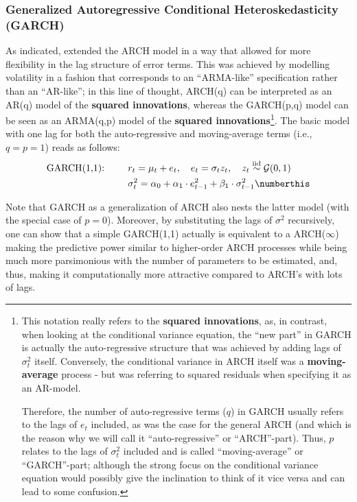 \subsubsection{Generalized Autoregressive Conditional Heteroskedasticity (GARCH)}
\label{sssec: lit_rev_vola_GARCH}

As indicated, \textcite{Bollerslev1986} extended the ARCH model in a way that allowed for more flexibility in the lag structure of error terms. This was achieved by modelling volatility in a fashion that corresponds to an \enquote{ARMA-like} specification rather than an \enquote{AR-like}; in this line of thought, ARCH(q) can be interpreted as an AR(q) model of the \textbf{squared innovations}, whereas the GARCH(p,q) model can be seen as an ARMA(q,p) model of the \textbf{squared innovations}\footnote{This notation really refers to the \textbf{squared innovations}, as, in contrast, when looking at the conditional variance equation, the \enquote{new part} in GARCH is actually the auto-regressive structure that was achieved by adding lags of $\sigma_t^2$ itself. Conversely, the conditional variance in ARCH itself was a \textbf{moving-average} process - but \textcite{Engle1982} was referring to squared residuals when specifying it as an AR-model. 

Therefore, the number of auto-regressive terms ($q$) in GARCH usually refers to the lags of $e_t$ included, as was the case for the general ARCH (and which is the reason why we will call it \enquote{auto-regressive} or \enquote{ARCH}-part). Thus, $p$ relates to the lags of $\sigma_t^2$ included and is called \enquote{moving-average} or \enquote{GARCH}-part; although the strong focus on the conditional variance equation would possibly give the inclination to think of it vice versa and can lead to some confusion.}.
The basic model with one lag for both the auto-regressive and moving-average terms (i.e., $q=p=1$) reads as follows:
\begin{align*}
\text{GARCH(1,1): }\qquad & r_t = \mu_{t} + e_{t}, \quad e_{t} = \sigma_{t} z_{t},\quad  z_{t} \overset{\text{iid}}{\sim} \mathcal{G}(0,1) \\
& \sigma_t^2 = \alpha_0 + \alpha_1 \cdot e_{t-1}^2 + \beta_1 \cdot \sigma_{t-1}^2 \label{eq: GARCH} \numberthis
\end{align*}

Note that GARCH as a generalization of ARCH also nests the latter model (with the special case of $p = 0$). Moreover, by substituting the lags of $\sigma^2$ recursively, one can show that a simple GARCH(1,1) actually is equivalent to a ARCH($\infty$) making the predictive power similar to higher-order ARCH processes while being much more parsimonious with the number of parameters to be estimated, and, thus, making it computationally more attractive compared to ARCH's with lots of lags. 

